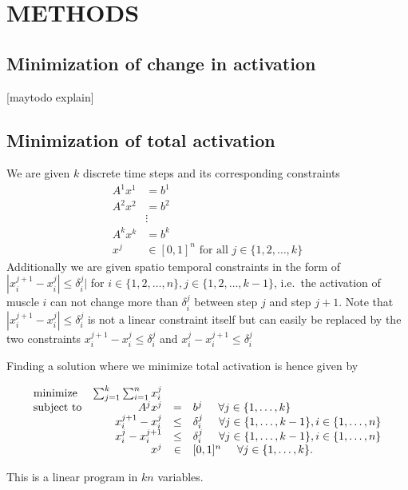 \section{METHODS}
\subsection{Minimization of change in activation} %
\label{sub:minimization_of_change_in_activation}
[maytodo explain]
\subsection{Minimization of total activation} %
We are given $k$ discrete time steps and its corresponding constraints
\begin{align*}
A^1 x^1 &= b^1 \\
A^2 x^2 &= b^2 \\
 &\vdots \\
A^k x^k &= b^k \\
x^j &\in [0,1]^n \text{ for all } j \in \{1,2,\dots,k\} 
\end{align*}
Additionally we are given spatio temporal constraints in the form of $|x_i^{j+1} - x_i^{j}| \leq \delta_i^j|$ for $i \in \{1,2,\dots,n\}, j \in \{1,2,\dots,k-1\}$, i.e.\ the activation of muscle $i$ can not change more than $\delta_i^j$ between step $j$ and step $j+1$. Note that $|x_i^{j+1} - x_i^{j}| \leq \delta_i^j$ is not a linear constraint itself but can easily be replaced by the two constraints $x_i^{j+1} - x_i^{j} \leq \delta_i^j$ and $x_i^{j} - x_i^{j+1} \leq \delta_i^j$

Finding a solution where we minimize total activation is hence given by

\begin{equation}
\begin{array}{lrcl}
\mbox{minimize} & \sum_{j=1}^k \sum_{i=1}^n x_i^j \\ 
\mbox{subject to} & A^j x^j &=& b^j \hspace{5mm} \forall j \in \{1,\dots, k\} \\
  & x_i^{j+1} - x_i^{j} &\leq& \delta_i^j  \hspace{5mm} \forall j \in \{1,\dots, k-1\}, i \in \{1,\dots,n\} \\
  & x_i^{j} - x_i^{j+1} &\leq& \delta_i^j  \hspace{5mm} \forall j \in \{1,\dots, k-1\}, i \in \{1,\dots,n\} \\
  & x^j &\in& [0,1]^n \hspace{5mm} \forall j \in \{1,\dots, k\}.
\end{array}
\end{equation}

This is a linear program in $kn$ variables.

